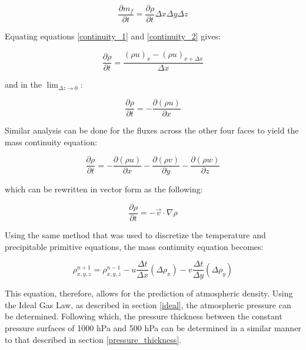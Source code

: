\begin{equation}
    \label{continuity_2}
    \frac{\partial m_f}{\partial t} = \frac{\partial \rho}{\partial t} \Delta x \Delta y \Delta z
\end{equation}

Equating equations \ref{continuity_1} and \ref{continuity_2} gives:

\begin{equation}
    \frac{\partial \rho}{\partial t} = \frac{(\rho u)_x - (\rho u)_{x + \Delta x}}{\Delta x}
\end{equation}

and in the $\lim_{\Delta z \to 0}$:

\begin{equation}
    \frac{\partial \rho}{\partial t} = - \frac{\partial (\rho u)}{\partial x}
\end{equation}

Similar analysis can be done for the fluxes across the other four faces to yield the mass continuity equation:

\begin{equation}
    \frac{\partial \rho}{\partial t} = - \frac{\partial (\rho u)}{\partial x} - \frac{\partial (\rho v)}{\partial y} - \frac{\partial (\rho w)}{\partial z}
\end{equation}

which can be rewritten in vector form as the following\cite{rho_primitive}:

\begin{equation}
    \frac{\partial \rho}{\partial t} = -\Vec{v} \cdot \nabla \rho
\end{equation}

Using the same method that was used to discretize the temperature and precipitable primitive equations, the mass continuity equation becomes:

\begin{equation}
    \rho^{n + 1}_{x, y, z} = \rho^{n - 1}_{x, y, z} - u \frac{\Delta t}{\Delta x} (\Delta \rho_{x})
    - v \frac{\Delta t}{\Delta y} (\Delta \rho_{y})
\end{equation}

This equation, therefore, allows for the prediction of atmospheric density. Using the Ideal Gas Law, as described in section \ref{ideal}, the atmospheric pressure can be determined. Following which, the pressure thickness between the constant pressure surfaces of 1000 hPa and 500 hPa can be determined in a similar manner to that described in section \ref{pressure_thickness}.
